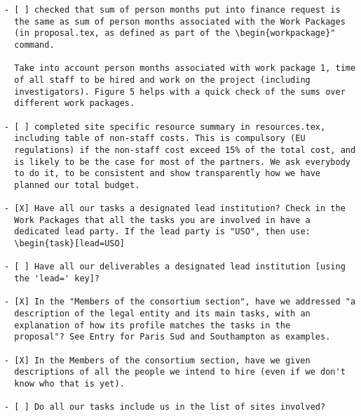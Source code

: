 \begin{draft}
\vspace{1cm}

\begin{verbatim}
- [ ] checked that sum of person months put into finance request is
  the same as sum of person months associated with the Work Packages
  (in proposal.tex, as defined as part of the \begin{workpackage}"
  command.
  
  Take into account person months associated with work package 1, time
  of all staff to be hired and work on the project (including
  investigators). Figure 5 helps with a quick check of the sums over
  different work packages.

- [ ] completed site specific resource summary in resources.tex,
  including table of non-staff costs. This is compulsory (EU
  regulations) if the non-staff cost exceed 15% of the total cost, and
  is likely to be the case for most of the partners. We ask everybody
  to do it, to be consistent and show transparently how we have
  planned our total budget.

- [X] Have all our tasks a designated lead institution? Check in the
  Work Packages that all the tasks you are involved in have a
  dedicated lead party. If the lead party is "USO", then use:
  \begin{task}[lead=USO]

- [ ] Have all our deliverables a designated lead institution [using
  the 'lead=' key]?

- [X] In the "Members of the consortium section", have we addressed "a
  description of the legal entity and its main tasks, with an
  explanation of how its profile matches the tasks in the
  proposal"? See Entry for Paris Sud and Southampton as examples.

- [X] In the Members of the consortium section, have we given
  descriptions of all the people we intend to hire (even if we don't
  know who that is yet). 
  
- [ ] Do all our tasks include us in the list of sites involved?
\end{verbatim}
\end{draft}




